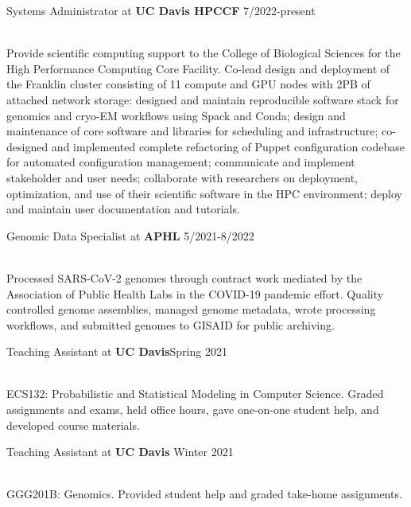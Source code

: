 \documentclass[resmargin,12pt]{camille_resume}
\begin{document}
\begin{resume}
\begin{list1}
\item[] Systems Administrator at {\bf UC Davis HPCCF} \hfill 7/2022-present\\\\
\begin{workdesc}
Provide scientific computing support to the College of Biological Sciences for the High Performance Computing Core Facility.
Co-lead design and deployment of the Franklin cluster consisting of 11 compute and GPU nodes with 2PB of attached network storage:
designed and maintain reproducible software stack for genomics and cryo-EM workflows using Spack and Conda; design and maintenance of
core software and libraries for scheduling and infrastructure; co-designed and implemented complete refactoring of Puppet configuration
codebase for automated configuration management; communicate and implement stakeholder and user needs; collaborate with researchers on deployment,
optimization, and use of their scientific software in the HPC environment; deploy and maintain user documentation and tutorials.
\end{workdesc}

\item[] Genomic Data Specialist at {\bf APHL} \hfill 5/2021-8/2022\\\\
\begin{workdesc}
Processed SARS-CoV-2 genomes through contract work mediated by the Association of Public Health Labs in the COVID-19 pandemic effort. 
Quality controlled genome assemblies, managed genome metadata, wrote processing workflows, and submitted genomes to GISAID for public archiving.
\end{workdesc}

\item[] Teaching Assistant at {\bf UC Davis}\hfill Spring 2021\\\\
\begin{workdesc}
ECS132: Probabilistic and Statistical Modeling in Computer Science. Graded assignments and exams, held office hours, gave one-on-one student help, 
and developed course materials.
\end{workdesc}

\item[] Teaching Assistant at {\bf UC Davis} \hfill Winter 2021\\\\
\begin{workdesc}
GGG201B: Genomics. Provided student help and graded take-home assignments.
\end{workdesc}


\end{list1}
\end{resume}
\end{document}
